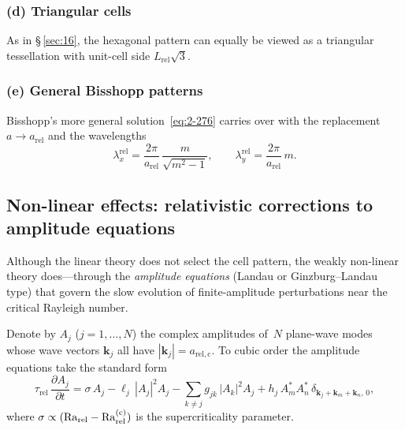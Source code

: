 \subsubsection*{(d) Triangular cells}

As in \S\,\ref{sec:16}, the hexagonal pattern can equally be viewed as
a triangular tessellation with unit-cell side $L_{\mathrm{rel}}\sqrt{3}$.

\subsubsection*{(e) General Bisshopp patterns}

Bisshopp's more general solution~\eqref{eq:2-276} carries over with
the replacement $a\to a_{\mathrm{rel}}$ and the wavelengths
\begin{equation}
\label{eq:rel-2-272}
\lambda_{x}^{\mathrm{rel}}
  = \frac{2\pi}{a_{\mathrm{rel}}}\,\frac{m}{\sqrt{m^{2}-1}},
\qquad
\lambda_{y}^{\mathrm{rel}}
  = \frac{2\pi}{a_{\mathrm{rel}}}\,m.
\end{equation}

\subsection{Non-linear effects: relativistic corrections to
  amplitude equations}\label{sec:rel-16-nonlinear}

Although the linear theory does not select the cell pattern, the
weakly non-linear theory does---through the \emph{amplitude equations}
(Landau or Ginzburg--Landau type) that govern the slow evolution of
finite-amplitude perturbations near the critical Rayleigh number.

Denote by $A_{j}$ ($j=1,\ldots,N$) the complex amplitudes of~$N$
plane-wave modes whose wave vectors $\mathbf{k}_{j}$ all have
$|\mathbf{k}_{j}|=a_{\mathrm{rel,c}}$.  To cubic order the amplitude
equations take the standard form
\begin{equation}
\label{eq:rel-amplitude}
\tau_{\mathrm{rel}}\,\frac{\partial A_{j}}{\partial t}
  = \sigma\,A_{j}
  - \ell_{j}\,|A_{j}|^{2}A_{j}
  - \sum_{k\neq j} g_{jk}\,|A_{k}|^{2}A_{j}
  + h_{j}\,A_{m}^{*}A_{n}^{*}\,\delta_{\mathbf{k}_{j}+\mathbf{k}_{m}+\mathbf{k}_{n},\,0},
\end{equation}
where $\sigma\propto(\mathrm{Ra}_{\mathrm{rel}}-\mathrm{Ra}_{\mathrm{rel}}^{(\mathrm{c})})$ is the
supercriticality parameter.

